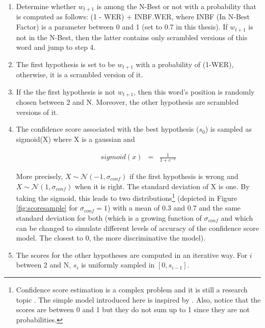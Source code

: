         \begin{enumerate}
        	\item Determine whether $w_{t+1}$ is among the N-Best or not with a probability that is computed as follows: (1 - WER) + INBF.WER, where INBF (In N-Best Factor) is a parameter between 0 and 1 (set to 0.7 in this thesis). If $w_{t+1}$ is not in the N-Best, then the latter contains only scrambled versions of this word and jump to step 4.
            \item The first hypothesis is set to be $w_{t+1}$ with a probability of (1-WER), otherwise, it is a scrambled version of it.
            \item If the the first hypothesis is not $w_{t+1}$, then this word's position is randomly chosen between 2 and N. Moreover, the other hypothesis are scrambled versions of it.
            \item The confidence score associated with the best hypothesis ($s_0$) is sampled as sigmoid(X) where X is a gaussian and
						
						\begin{eqnarray}
							sigmoid(x) & = & \frac{1}{1 + e^{-x}}
						\end{eqnarray}
						
						More precisely, $X \sim \mathcal{N} (-1,\sigma_{conf})$ if the first hypothesis is wrong and $X \sim \mathcal{N} (1,\sigma_{conf})$ when it is right. The standard deviation of X is one. By taking the sigmoid, this leads to two distributions\footnote{Confidence score estimation is a complex problem and it is still a research topic \cite{Jiang2005,Seigel2011}. The simple model introduced here is inspired by \cite{Pietquin2005}. Also, notice that the scores are between 0 and 1 but they do not sum up to 1 since they are not probabilities.} (depicted in Figure \ref{fig:scoresample} for $\sigma_{conf} = 1$) with a mean of 0.3 and 0.7 and the same standard deviation for both (which is a growing function of $\sigma_{conf}$ and which can be changed to simulate different levels of accuracy of the confidence score model. The closest to 0, the more discriminative the model).
            \item The scores for the other hypotheses are computed in an iterative way. For $i$ between 2 and N, $s_i$ is uniformly sampled in $[0,s_{i-1}]$.
        \end{enumerate}
        
        
